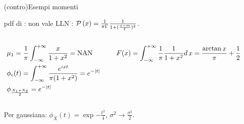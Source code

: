 \documentclass[asd-beamer.tex]{subfiles}%
\begin{document}
\begin{wordonframe}{(contro)Esempi momenti}
\begin{block}{pdf di : non vale LLN}
: $\operatorname{\mathcal{P}}{(x)}=\frac{1}{\pi\Gamma}\frac{1}{1+(\frac{x-m}{\Gamma})^2}$.
\begin{columns}[T]
\begin{column}{0.5\textwidth}
\begin{align*}
&\mu_1=\frac{1}{\pi}\int_{-\infty}^{+\infty}{}\frac{x}{1+x^2}=\operatorname{NAN}{}\\
&\phi_c(t)=\int_{-\infty}^{+\infty}{}\frac{e^{ixt}}{\pi(1+x^2)}=e^{-|t|}\\
&\phi_{\frac{X_1+X_2}{2}}=e^{-|t|}
\end{align*}
\end{column}
\begin{column}{0.5\textwidth}
\begin{align*}
&F(x)=\int_{-\infty}^{+\infty}{}\frac{1}{\pi}\frac{1}{1+x^2}d\,x=\frac{\arctan{x}}{\pi}+\frac{1}{2}
\end{align*}
\end{column}
\end{columns}
Per gaussiana: $\phi_{\overline{X}}(t)=\exp{-\frac{t^2}{4}}$, $\sigma^2\to\frac{\sigma^2}{2}$.
\end{block}
\end{wordonframe}

\end{document}
